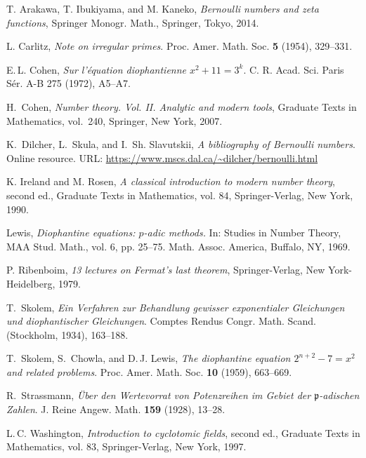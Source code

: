 \let\oldaddcontenttsline\addcontentsline
\renewcommand{\addcontentsline}[3]{}
\begin{thebibliography}{11}
 T. Arakawa, T. Ibukiyama, and M. Kaneko, 
\emph{Bernoulli numbers and zeta functions}, Springer Monogr. Math., Springer, Tokyo, 2014.


 L. Carlitz, \emph{
Note on irregular primes}. Proc. Amer. Math. Soc. \textbf{5} (1954), 329--331.


E.\,L. Cohen, \emph{Sur l'équation diophantienne $x^2+11=3^k$}. C. R. Acad. Sci. Paris Sér. A-B 275 (1972), A5--A7.

H.~Cohen, \emph{Number theory. Vol. II. Analytic and modern tools}, Graduate Texts in Mathematics, vol.~240, Springer, New York, 2007. 

 K.~Dilcher, L.~Skula, and I.~Sh. Slavutskii, \emph{A bibliography of Bernoulli numbers}. Online resource. URL: \url{https://www.mscs.dal.ca/~dilcher/bernoulli.html}

 K. Ireland and M. Rosen, \emph{A classical introduction to modern number theory}, second ed., Graduate Texts in Mathematics, vol. 84, Springer-Verlag, New York, 1990.

 Lewis, \emph{
Diophantine equations: $p$-adic methods.} In: Studies in Number Theory, MAA Stud. Math., vol. 6, pp. 25--75. Math. Assoc. America, Buffalo, NY, 1969.

 P. Ribenboim, \emph{13 lectures on Fermat's last theorem}, Springer-Verlag, New York-Heidelberg, 1979. 

 T.~Skolem, \emph{Ein Verfahren zur Behandlung gewisser exponentialer Gleichungen und diophantischer Gleichungen}. 
Comptes Rendus Congr. Math. Scand. (Stockholm, 1934), 163--188. 

 T.~Skolem, S.~Chowla, and {D.\,J.} Lewis, \emph{The diophantine equation $2^{n+2}-7=x^2$ and related problems}.
Proc. Amer. Math. Soc. \textbf{10} (1959), 663--669.

 R.~Strassmann, \emph{\"{U}ber den Wertevorrat von Potenzreihen im Gebiet der $\mathfrak{p}$-adischen Zahlen}. J. Reine Angew. Math. \textbf{159} (1928), 13--28.

 L.\,C. Washington, \emph{Introduction to cyclotomic fields}, second ed., Graduate Texts in Mathematics, vol. 83, Springer-Verlag, New York, 1997.

\end{thebibliography}
\let\addcontentsline\oldaddcontentsline


